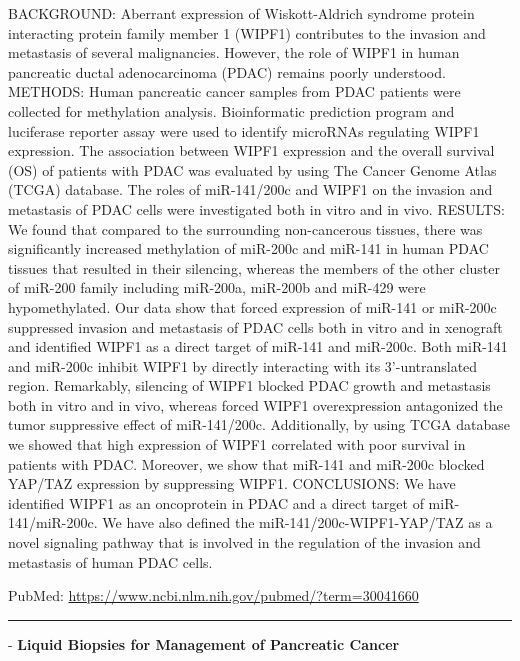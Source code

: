 \documentclass[]{article}
\begin{document}
BACKGROUND: Aberrant expression of Wiskott-Aldrich syndrome protein
interacting protein family member 1 (WIPF1) contributes to the invasion
and metastasis of several malignancies. However, the role of WIPF1 in
human pancreatic ductal adenocarcinoma (PDAC) remains poorly understood.
METHODS: Human pancreatic cancer samples from PDAC patients were
collected for methylation analysis. Bioinformatic prediction program and
luciferase reporter assay were used to identify microRNAs regulating
WIPF1 expression. The association between WIPF1 expression and the
overall survival (OS) of patients with PDAC was evaluated by using The
Cancer Genome Atlas (TCGA) database. The roles of miR-141/200c and WIPF1
on the invasion and metastasis of PDAC cells were investigated both in
vitro and in vivo. RESULTS: We found that compared to the surrounding
non-cancerous tissues, there was significantly increased methylation of
miR-200c and miR-141 in human PDAC tissues that resulted in their
silencing, whereas the members of the other cluster of miR-200 family
including miR-200a, miR-200b and miR-429 were hypomethylated. Our data
show that forced expression of miR-141 or miR-200c suppressed invasion
and metastasis of PDAC cells both in vitro and in xenograft and
identified WIPF1 as a direct target of miR-141 and miR-200c. Both
miR-141 and miR-200c inhibit WIPF1 by directly interacting with its
3'-untranslated region. Remarkably, silencing of WIPF1 blocked PDAC
growth and metastasis both in vitro and in vivo, whereas forced WIPF1
overexpression antagonized the tumor suppressive effect of miR-141/200c.
Additionally, by using TCGA database we showed that high expression of
WIPF1 correlated with poor survival in patients with PDAC. Moreover, we
show that miR-141 and miR-200c blocked YAP/TAZ expression by suppressing
WIPF1. CONCLUSIONS: We have identified WIPF1 as an oncoprotein in PDAC
and a direct target of miR-141/miR-200c. We have also defined the
miR-141/200c-WIPF1-YAP/TAZ as a novel signaling pathway that is involved
in the regulation of the invasion and metastasis of human PDAC cells.

PubMed: \url{https://www.ncbi.nlm.nih.gov/pubmed/?term=30041660}

{}

{}

\begin{center}\rule{0.5\linewidth}{\linethickness}\end{center}

 - \textbf{Liquid Biopsies for Management of Pancreatic Cancer}
\end{document}
